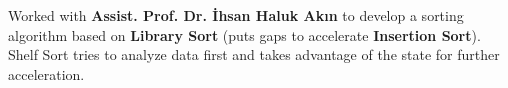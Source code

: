 \documentclass[]{furkanvarol-resume}
\begin{document}
\begin{minipage}[t]{0.66\textwidth}

Worked with \textbf{Assist. Prof. Dr. İhsan Haluk Akın} to develop a sorting algorithm
based on \textbf{Library Sort} (puts gaps to accelerate \textbf{Insertion Sort}).
Shelf Sort tries to analyze data first and takes advantage of the state for further acceleration.
\sectionsep

\end{minipage}
\end{document}
